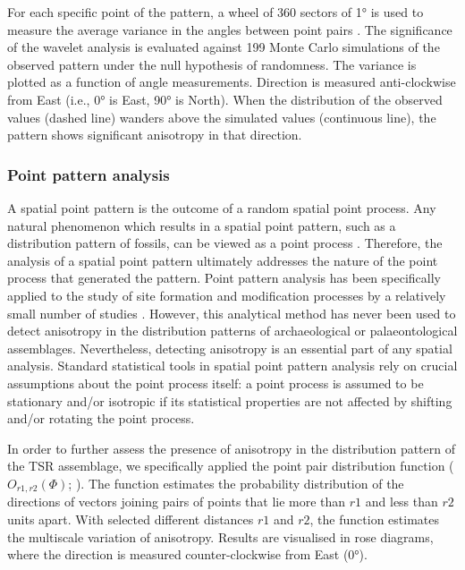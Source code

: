 \documentclass[5p,times,authoryear]{elsarticle}
\begin{document}
For each specific point of the pattern, a wheel of 360 sectors of 1° is used to measure the average variance in the angles between point pairs \citep{Rosenberg2004}. The significance of the wavelet analysis is evaluated against 199 Monte Carlo simulations of the observed pattern under the null hypothesis of randomness. The variance is plotted as a function of angle measurements. Direction is measured anti-clockwise from East (i.e., 0° is East, 90° is North). When the distribution of the observed values (dashed line) wanders above the simulated values (continuous line), the pattern shows significant anisotropy in that direction.

\subsubsection{Point pattern analysis}

A spatial point pattern is the outcome of a random spatial point process. Any natural phenomenon which results in a spatial point pattern, such as a distribution pattern of fossils, can be viewed as a point process \citep{spatstatBook}. Therefore, the analysis of a spatial point pattern ultimately addresses the nature of the point process that generated the pattern. Point pattern analysis has been specifically applied to the study of site formation and modification processes by a relatively small number of studies \citep{Lenoble2008,Dominguez-Rodrigo2014b,Dominguez-Rodrigo2014c,Dominguez-Rodrigo2017,Giusti2016,Giusti,Organista2017}. However, this analytical method has never been used to detect anisotropy in the distribution patterns of archaeological or palaeontological assemblages. Nevertheless, detecting anisotropy is an essential part of any spatial analysis. Standard statistical tools in spatial point pattern analysis rely on crucial assumptions about the point process itself: a point process is assumed to be stationary and/or isotropic if its statistical properties are not affected by shifting and/or rotating the point process.

In order to further assess the presence of anisotropy in the distribution pattern of the TSR assemblage, we specifically applied the point pair distribution function ($O_{r1,r2}(\Phi)$; \citealp{spatstatBook}). The function estimates the probability distribution of the directions of vectors joining pairs of points that lie more than $r1$ and less than $r2$ units apart. With selected different distances $r1$ and $r2$, the function estimates the multiscale variation of anisotropy. Results are visualised in rose diagrams, where the direction is measured counter-clockwise from East (0°).
\end{document}
